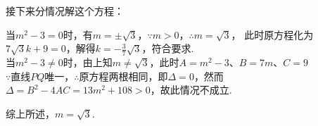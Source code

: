 \documentclass[10pt]{article}
\begin{document}
\begin{questions}{}
    接下来分情况解这个方程：
    \begin{subsubquestions}
        \subsubquestion 当$m^2-3=0$时，有$m=\pm \sqrt{3}$，$\because m>0$，$\therefore m=\sqrt{3}$，
        此时原方程化为$7\sqrt{3}k+9=0$，解得$k=-\frac{3}{7}\sqrt{3}$，符合要求.\\
        \subsubquestion 当$m^2-3 \neq 0$时，由上知$m \neq \sqrt{3}$，此时$A=m^2-3$、$B=7m$、$C=9$ \\
        $\because$直线$PQ$唯一，$\therefore$原方程两根相同，即$\Delta=0$，然而$\Delta=B^2-4AC=13m^2+108>0$，故此情况不成立.\\
    \end{subsubquestions}
    综上所述，$m=\sqrt{3}$.
\end{questions}
\end{document}
